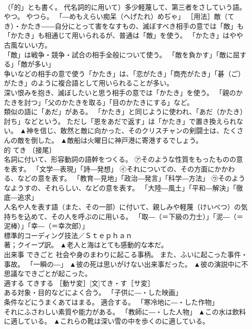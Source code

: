 \documentclass[8pt]{extreport}
\begin{document}
\begin{CJK}{UTF8}{min}
\\	（「的」とも書く。 代名詞的に用いて）多少軽蔑して、第三者をさしていう語。 やつ。 やつら。 「―めもえらい痴呆（へげたれ）めぢゃ」 ［用法］敵（てき）・かたき――自分にとって害をなすもの、滅ぼすべき相手の意では「敵」も「かたき」も相通じて用いられるが、普通は「敵」を使う。 「かたき」はやや古風ないい方。 
\\	「敵」は戦争・競争・試合の相手全般について使う。 「敵を負かす」「敵に屈する」「敵が多い」
\\	争いなどの相手の意で使う「かたき」は、「恋がたき」「商売がたき」「碁（ご）がたき」のように複合語として用いられることが多い。 
\\	深い恨みを抱き、滅ぼしたいと思う相手の意では「かたき」を使う。 「親のかたきを討つ」「父のかたきを取る」「目のかたきにする」など。 
\\	類似の語に「あだ」がある。 「かたき」と同じように使われ、「あだ（かたき）討ち」などという。 ただし「恩をあだで返す」は「かたき」で置き換えられない。	▲神を信じ、敢然と敵に向かった、そのクリスチャンの剣闘士は、たくさんの敵を倒した。 ▲敵船は火曜日に神戸港に寄港するでしょう。
\\	的	てき	〔接尾〕 
\\	名詞に付いて、形容動詞の語幹をつくる。 ㋐そのような性質をもったものの意を表す。 「文学―表現」「詩―発想」 ㋑それについての、その方面にかかわる、などの意を表す。 「教育―見地」「政治―発言」「科学―方法」 ㋒そのようなようすの、それらしい、などの意を表す。 「大陸―風土」「平和―解決」「徹底―追求」 
\\	人名や人を表す語（また、その一部）に付いて、親しみや軽蔑（けいべつ）の気持ちを込めて、その人を呼ぶのに用いる。 「取―（＝下級の力士）」「泥―（＝泥棒）」「幸―（＝幸次郎）」	
\\	標準的コーディング技法／Ｓｔｅｐｈａｎ 
\\	著；クイープ訳。 ▲老人と海はとても感動的な本だ。
\\	出来事	できごと	社会や身のまわりに起こる事柄。 また、ふいに起こった事件・事故。 「一瞬の―」	▲彼の死は思いがけない出来事だった。 ▲彼の演説中に不思議なできごとが起こった。
\\	適する	てきする	［動サ変］[文]てき・す［サ変］ 
\\	ある対象・目的などによく合う。 「子供に―・した映画」 
\\	条件などにうまくあてはまる。 適合する。 「寒冷地に―・した作物」 
\\	それにふさわしい素質や能力がある。 「教師に―・した人物」	▲この水は飲料に適している。 ▲これらの靴は深い雪の中を歩くのに適している。

\end{CJK}
\end{document}
